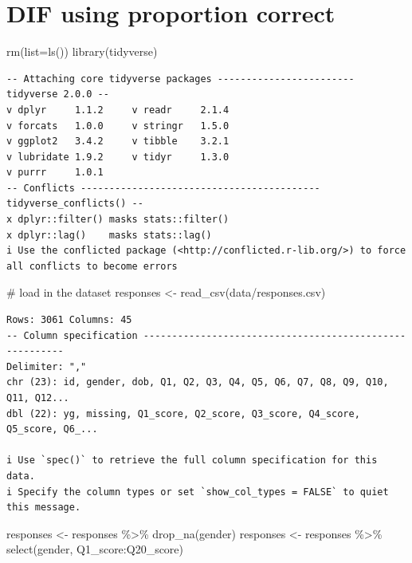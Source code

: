 \documentclass[
  letterpaper,
  DIV=11,
  numbers=noendperiod]{scrreprt}
\newenvironment{Shaded}{\begin{snugshade}}{\end{snugshade}}
\newcommand{\AttributeTok}[1]{\textcolor[rgb]{0.40,0.45,0.13}{#1}}
\newcommand{\CommentTok}[1]{\textcolor[rgb]{0.37,0.37,0.37}{#1}}
\newcommand{\FunctionTok}[1]{\textcolor[rgb]{0.28,0.35,0.67}{#1}}
\newcommand{\NormalTok}[1]{\textcolor[rgb]{0.00,0.23,0.31}{#1}}
\newcommand{\OtherTok}[1]{\textcolor[rgb]{0.00,0.23,0.31}{#1}}
\newcommand{\SpecialCharTok}[1]{\textcolor[rgb]{0.37,0.37,0.37}{#1}}
\newcommand{\StringTok}[1]{\textcolor[rgb]{0.13,0.47,0.30}{#1}}
\begin{document}
\hypertarget{dif-using-proportion-correct}{%
\chapter{DIF using proportion
correct}\label{dif-using-proportion-correct}}

\begin{Shaded}
\begin{Highlighting}[]
\FunctionTok{rm}\NormalTok{(}\AttributeTok{list=}\FunctionTok{ls}\NormalTok{())}
\FunctionTok{library}\NormalTok{(tidyverse)}
\end{Highlighting}
\end{Shaded}

\begin{verbatim}
-- Attaching core tidyverse packages ------------------------ tidyverse 2.0.0 --
v dplyr     1.1.2     v readr     2.1.4
v forcats   1.0.0     v stringr   1.5.0
v ggplot2   3.4.2     v tibble    3.2.1
v lubridate 1.9.2     v tidyr     1.3.0
v purrr     1.0.1     
-- Conflicts ------------------------------------------ tidyverse_conflicts() --
x dplyr::filter() masks stats::filter()
x dplyr::lag()    masks stats::lag()
i Use the conflicted package (<http://conflicted.r-lib.org/>) to force all conflicts to become errors
\end{verbatim}

\begin{Shaded}
\begin{Highlighting}[]
\CommentTok{\# load in the dataset}
\NormalTok{responses }\OtherTok{\textless{}{-}} \FunctionTok{read\_csv}\NormalTok{(}\StringTok{\textquotesingle{}data/responses.csv\textquotesingle{}}\NormalTok{)}
\end{Highlighting}
\end{Shaded}

\begin{verbatim}
Rows: 3061 Columns: 45
-- Column specification --------------------------------------------------------
Delimiter: ","
chr (23): id, gender, dob, Q1, Q2, Q3, Q4, Q5, Q6, Q7, Q8, Q9, Q10, Q11, Q12...
dbl (22): yg, missing, Q1_score, Q2_score, Q3_score, Q4_score, Q5_score, Q6_...

i Use `spec()` to retrieve the full column specification for this data.
i Specify the column types or set `show_col_types = FALSE` to quiet this message.
\end{verbatim}

\begin{Shaded}
\begin{Highlighting}[]
\NormalTok{responses }\OtherTok{\textless{}{-}}\NormalTok{ responses }\SpecialCharTok{\%\textgreater{}\%} \FunctionTok{drop\_na}\NormalTok{(gender)}
\NormalTok{responses }\OtherTok{\textless{}{-}}\NormalTok{ responses }\SpecialCharTok{\%\textgreater{}\%} \FunctionTok{select}\NormalTok{(gender, Q1\_score}\SpecialCharTok{:}\NormalTok{Q20\_score)}
\end{Highlighting}
\end{Shaded}
\end{document}
